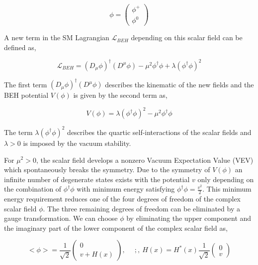 \begin{equation}
\phi = \begin{pmatrix} \phi^{+} \\ \phi^{0} \end{pmatrix}
\end{equation}

A new term in the SM Lagrangian $\mathcal{L}_{BEH}$ depending on this scalar field can be defined as, 

\begin{equation}
\mathcal{L}_{BEH}  = (D_{\mu} \phi)^{\dagger} ( D^{\mu} \phi) - \mu^2 \phi^{\dagger} \phi + \lambda (\phi^{\dagger} \phi)^2
\label{eqn:LagBEH}
\end{equation}

The first term $(D_{\mu} \phi)^{\dagger} ( D^{\mu} \phi)$ describes the kinematic of the new fields and the BEH potential $V(\phi)$ is given by the second term as, 

\begin{equation}
V(\phi) = \lambda (\phi^{\dagger} \phi)^2 - \mu^2 \phi^{\dagger} \phi
\label{eqn:HiggsPot}
\end{equation}

The term $\lambda (\phi^{\dagger} \phi)^2$ describes the quartic self-interactions of the scalar fields and $\lambda > 0 $ is imposed by the vacuum stability. 

For $\mu^2 > 0$, the scalar field develops a nonzero Vacuum Expectation Value (VEV) which spontaneously breaks the symmetry. Due to the symmetry of $V(\phi)$ an infinite number of degenerate states exists with the potential $v$ only depending on the combination of $\phi^{\dagger}\phi$ 
\cite{PeskinQFT} with minimum energy satisfying $\phi^{\dagger}\phi = \frac{v^2}{2}$. This minimum energy requirement reduces one of the four degrees of freedom of the complex scalar field $\phi$. The three remaining degrees of freedom can be eliminated by a gauge transformation. We can choose $\phi$ by eliminating the upper component and the imaginary part of the lower component of the complex scalar field as,

\begin{equation}
<\phi> = \frac{1}{\sqrt{2}}\begin{pmatrix} 0 \\ v+H(x) \end{pmatrix},~ \hspace{10pt} ~;,~ H(x) = H^{*}(x) 
 \frac{1}{\sqrt{2}} \begin{pmatrix} 0 \\ v \end{pmatrix}
\label{eqn:ScalarExp}
\end{equation}

